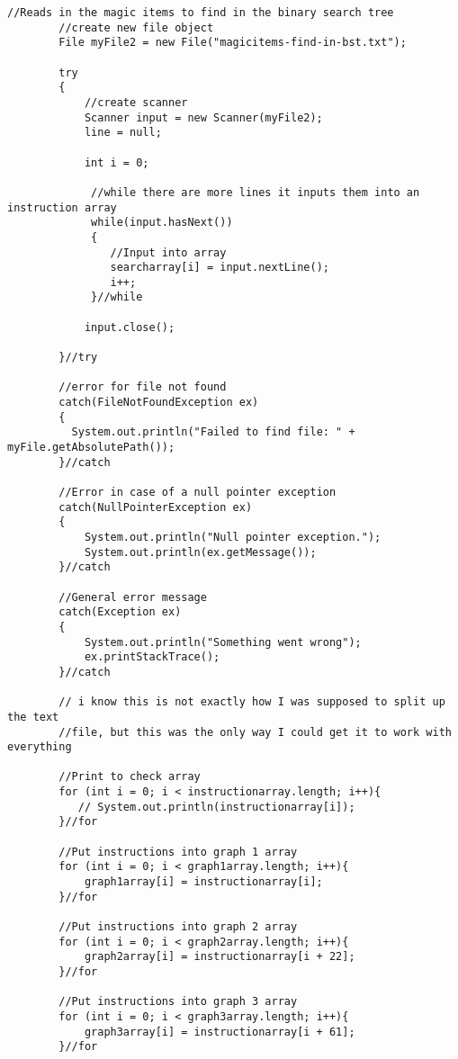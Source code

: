 \documentclass[letterpaper, 10pt,DIV=13]{scrartcl}
\numberwithin{equation}{section} %
\numberwithin{figure}{section} %
\numberwithin{table}{section} %
\begin{document}
\begin{lstlisting}[frame=single, ]
        //Reads in the magic items to find in the binary search tree 
        //create new file object
        File myFile2 = new File("magicitems-find-in-bst.txt");
        
        try
        {
            //create scanner
            Scanner input = new Scanner(myFile2);
            line = null;
            
            int i = 0;

             //while there are more lines it inputs them into an instruction array
             while(input.hasNext())
             {  
                //Input into array 
                searcharray[i] = input.nextLine();
                i++;
             }//while
             
            input.close();  

        }//try
        
        //error for file not found
        catch(FileNotFoundException ex)
        {
          System.out.println("Failed to find file: " + myFile.getAbsolutePath()); 
        }//catch

        //Error in case of a null pointer exception
        catch(NullPointerException ex)
        {
            System.out.println("Null pointer exception.");
            System.out.println(ex.getMessage());
        }//catch

        //General error message
        catch(Exception ex)
        {
            System.out.println("Something went wrong");
            ex.printStackTrace();
        }//catch

        // i know this is not exactly how I was supposed to split up the text
        //file, but this was the only way I could get it to work with everything 

        //Print to check array 
        for (int i = 0; i < instructionarray.length; i++){
           // System.out.println(instructionarray[i]);
        }//for

        //Put instructions into graph 1 array
        for (int i = 0; i < graph1array.length; i++){
            graph1array[i] = instructionarray[i];
        }//for

        //Put instructions into graph 2 array
        for (int i = 0; i < graph2array.length; i++){
            graph2array[i] = instructionarray[i + 22];
        }//for

        //Put instructions into graph 3 array
        for (int i = 0; i < graph3array.length; i++){
            graph3array[i] = instructionarray[i + 61];
        }//for


\end{lstlisting}
\end{document}
